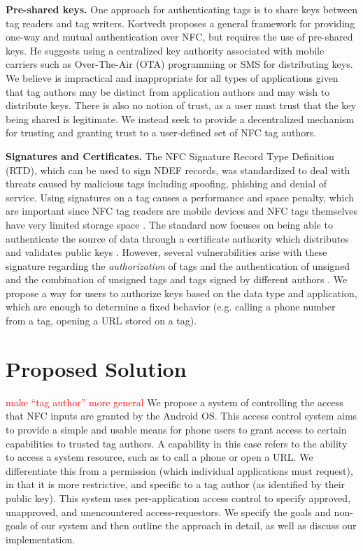 \documentclass[12pt]{article}
\newcommand\todo[1]{\textcolor{red}{#1}}
\begin{document}
\textbf{Pre-shared keys.}
One approach for authenticating tags is to share keys between tag readers and tag writers.
Kortvedt \cite{kortvedt2009} proposes a general framework for providing one-way and mutual authentication over NFC, but requires the use of pre-shared keys.
He suggests using a centralized key authority associated with mobile carriers such as Over-The-Air (OTA) programming or SMS for distributing keys.
We believe is impractical and inappropriate for all types of applications given that tag authors may be distinct from application authors and may wish to distribute keys.
There is also no notion of trust, as a user must trust that the key being shared is legitimate.
We instead seek to provide a decentralized mechanism for trusting and granting trust to a user-defined set of NFC tag authors.

\textbf{Signatures and Certificates.}
The NFC Signature Record Type Definition (RTD), which can be used to sign NDEF records, was standardized to deal with threats caused by malicious tags including spoofing, phishing and denial of service.
Using signatures on a tag causes a performance and space penalty, which are important since NFC tag readers are mobile devices and NFC tags themselves have very limited storage space \cite{kilas2009}.
The standard now focuses on being able to authenticate the source of data through a certificate authority which distributes and validates public keys \cite{rosati2011}.
However, several vulnerabilities arise with these signature regarding the \textit{authorization} of tags and the authentication of unsigned and the combination of unsigned tags and tags signed by different authors \cite{roland2010,roland2011}.
We propose a way for users to authorize keys based on the data type and application, which are enough to determine a fixed behavior (e.g. calling a phone number from a tag, opening a URL stored on a tag).


\section{Proposed Solution}
\todo{make ``tag author'' more general}
We propose a system of controlling the access that NFC inputs are granted by the Android OS.
This access control system aims to provide a simple and usable means for phone users to grant access to certain capabilities to trusted tag authors.
A capability in this case refers to the ability to access a system resource, such as to call a phone or open a URL.
We differentiate this from a permission (which individual applications must request), in that it is more restrictive, and specific to a tag author (as identified by their public key).
This system uses per-application access control to specify approved, unapproved, and unencountered access-requestors.
We specify the goals and non-goals of our system and then outline the approach in detail, as well as discuss our implementation.
\end{document}

